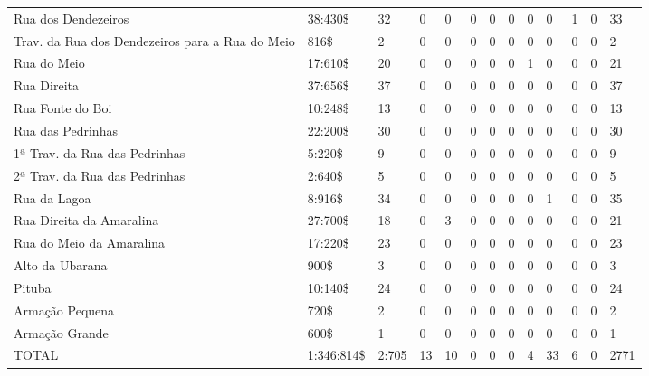 \begin{table}[!htp]
{\begin{tiny}
\begin{tabular}{m{3cm} m{1cm} m{} m{} m{} m{} m{} m{} m{} m{} m{} m{} m{}}
Rua dos Dendezeiros						&38:430\$	&32	&0	&0	&0	&0	&0	&0	&0	&1	&0	&33\\
Trav. da Rua dos Dendezeiros para a Rua do Meio		&816\$		&2	&0	&0	&0	&0	&0	&0	&0	&0	&0	&2\\
Rua do Meio							&17:610\$	&20	&0	&0	&0	&0	&0	&1	&0	&0	&0	&21\\
Rua Direita							&37:656\$	&37	&0	&0	&0	&0	&0	&0	&0	&0	&0	&37\\
Rua Fonte do Boi						&10:248\$	&13	&0	&0	&0	&0	&0	&0	&0	&0	&0	&13\\
Rua das Pedrinhas						&22:200\$	&30	&0	&0	&0	&0	&0	&0	&0	&0	&0	&30\\
1ª Trav. da Rua das Pedrinhas				&5:220\$	&9	&0	&0	&0	&0	&0	&0	&0	&0	&0	&9\\
2ª Trav. da Rua das Pedrinhas				&2:640\$	&5	&0	&0	&0	&0	&0	&0	&0	&0	&0	&5\\
Rua da Lagoa							&8:916\$	&34	&0	&0	&0	&0	&0	&0	&1	&0	&0	&35\\
Rua Direita da Amaralina					&27:700\$	&18	&0	&3	&0	&0	&0	&0	&0	&0	&0	&21\\
Rua do Meio da Amaralina					&17:220\$	&23	&0	&0	&0	&0	&0	&0	&0	&0	&0	&23\\
Alto da Ubarana							&900\$		&3	&0	&0	&0	&0	&0	&0	&0	&0	&0	&3\\
Pituba								&10:140\$	&24	&0	&0	&0	&0	&0	&0	&0	&0	&0	&24\\
Armação Pequena							&720\$		&2	&0	&0	&0	&0	&0	&0	&0	&0	&0	&2\\
Armação Grande							&600\$		&1	&0	&0	&0	&0	&0	&0	&0	&0	&0	&1\\
\hline
TOTAL								&1:346:814\$	&2:705	&13	&10	&0	&0	&0	&4	&33	&6	&0	&2771\\
\hline
\end{tabular} 
\end{tiny}
}
{}
\end{table}
